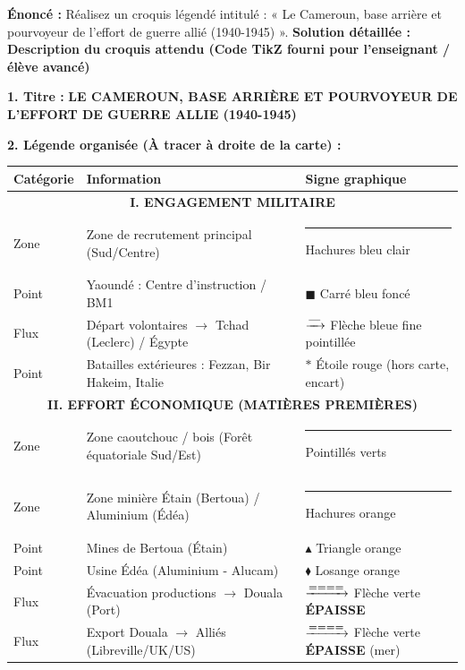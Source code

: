\documentclass[11pt]{article}
\newcommand{\cle}[1]{{\popxbold\color{popdark}#1}}
\def\star{\mathbin{\ast}}\def\bigstar{\mathord{\ast}}%
\begin{document}
\begin{exoresolu}
\textbf{Énoncé :} Réalisez un croquis légendé intitulé : « Le Cameroun, base arrière et pourvoyeur de l'effort de guerre allié (1940-1945) ».
\tcblower
\textbf{Solution détaillée : Description du croquis attendu (Code TikZ fourni pour l'enseignant / élève avancé)}

\textbf{1. Titre :} \textbf{LE CAMEROUN, BASE ARRIÈRE ET POURVOYEUR DE L'EFFORT DE GUERRE ALLIE (1940-1945)}

\textbf{2. Légende organisée (À tracer à droite de la carte) :}
\begin{center}
\begin{tabular}{|l|l|l|}\hline
\rowcolor{popblueL} \textbf{Catégorie} & \textbf{Information} & \textbf{Signe graphique} \\ \hline
\multicolumn{3}{|c|}{\textbf{I. ENGAGEMENT MILITAIRE}} \\ \hline
Zone & Zone de recrutement principal (Sud/Centre) & \textcolor{popblue}{\rule{1cm}{4pt}} Hachures bleu clair \\ \hline
Point & Yaoundé : Centre d'instruction / BM1 & $\blacksquare$ Carré bleu foncé \\ \hline
Flux & Départ volontaires $\rightarrow$ Tchad (Leclerc) / Égypte & $\xrightarrow{\text{\textbf{---}}} $ Flèche bleue fine pointillée \\ \hline
Point & Batailles extérieures : Fezzan, Bir Hakeim, Italie & $\star$ Étoile rouge (hors carte, encart) \\ \hline
\multicolumn{3}{|c|}{\textbf{II. EFFORT ÉCONOMIQUE (MATIÈRES PREMIÈRES)}} \\ \hline
Zone & Zone caoutchouc / bois (Forêt équatoriale Sud/Est) & \textcolor{popgreen}{\rule{1cm}{4pt}} Pointillés verts \\ \hline
Zone & Zone minière Étain (Bertoua) / Aluminium (Édéa) & \textcolor{poporange}{\rule{1cm}{4pt}} Hachures orange \\ \hline
Point & Mines de \cle{Bertoua} (Étain) & $\blacktriangle$ Triangle orange \\ \hline
Point & Usine \cle{Édéa} (Aluminium - Alucam) & $\blacklozenge$ Losange orange \\ \hline
Flux & Évacuation productions $\rightarrow$ \cle{Douala} (Port) & $\xrightarrow{\text{\textbf{====}}} $ Flèche verte \textbf{ÉPAISSE} \\ \hline
Flux & Export Douala $\rightarrow$ Alliés (Libreville/UK/US) & $\xrightarrow{\text{\textbf{====}}} $ Flèche verte \textbf{ÉPAISSE} (mer) \\ \hline

\end{tabular}
\end{center}
\end{exoresolu}
\end{document}
